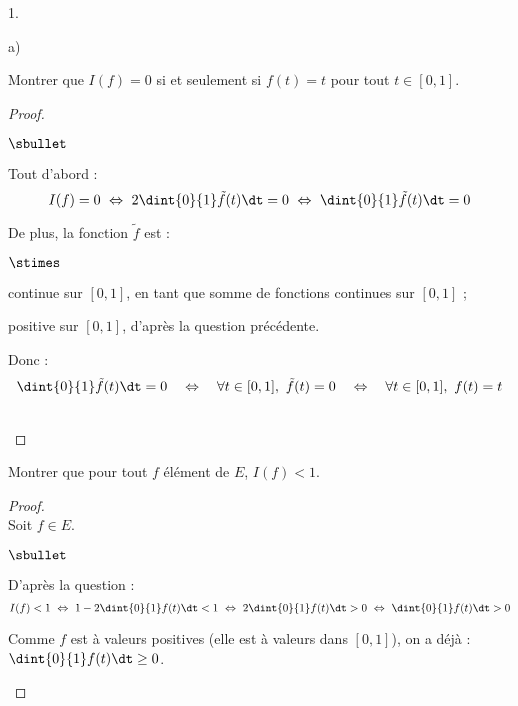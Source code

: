 \begin{noliste}{1.}
\begin{noliste}{a)}
  
  \item Montrer que $I(f) =0$ si et seulement si $f(t)=t$ pour tout $t 
  \in [0,1]$. 
  
  \begin{proof}~
  \begin{noliste}{$\sbullet$}
    \item Tout d'abord :
    \[
      I(f) = 0 \ \Leftrightarrow \ 2 \dint{0}{1} \tilde{f}(t) \dt =0
      \ \Leftrightarrow \ \dint{0}{1} \tilde{f}(t) \dt=0
    \]

    \item De plus, la fonction $\tilde{f}$ est :
    \begin{noliste}{$\stimes$}
      \item continue sur $[0,1]$, en tant que somme de fonctions
      continues sur $[0,1]$ ;
      \item positive sur $[0,1]$, d'après la question précédente.
    \end{noliste}
    Donc :
    \[
      \dint{0}{1} \tilde{f}(t) \dt = 0 \quad \Leftrightarrow \quad 
      \forall t \in [0,1], \ \tilde{f}(t)=0 \quad 
      \Leftrightarrow \quad \forall t \in [0,1], \ f(t)=t
    \]
  \end{noliste}
  ~\\[-1cm]
  \end{proof}
  
  
  
  \newpage
  

  
  \item Montrer que pour tout $f$ élément de $E$, $I(f) < 1$.
  
  \begin{proof}~\\
    Soit $f\in E$.
    \begin{noliste}{$\sbullet$}
      \item D'après la question  :
      \[
        I(f) <1 \ \Leftrightarrow \ 1-2\dint{0}{1} f(t) \dt <1 \
        \Leftrightarrow \ 2 \dint{0}{1} f(t) \dt >0 \ 
        \Leftrightarrow \ \dint{0}{1} f(t) \dt >0
      \]
      
      \item Comme $f$ est à valeurs positives (elle est à valeurs dans 
      $[0,1]$), on a déjà : $\dint{0}{1} f(t) \dt \geq 0$.
      

\end{noliste}
\end{proof}
\end{noliste}
\end{noliste}
